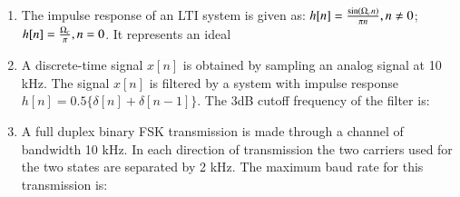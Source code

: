 \documentclass[journal,12pt,onecolumn]{IEEEtran}
\theoremstyle{remark}
\begin{document}
\begin{enumerate}
    \hfill{}
        \begin{enumerate}
        \end{enumerate}

    \item The impulse response of an LTI system is given as:
    $h[n] = \frac{\sin\left(\ohm_c n\right)}{\pi n}, n \neq 0$; $h[n] = \frac{\ohm_c}{\pi}, n=0$. It represents an ideal

    \hfill{}
        \begin{enumerate}
        \end{enumerate}

    \item A discrete-time signal $x[n]$ is obtained by sampling an analog signal at 10 kHz. The signal $x[n]$ is filtered by a system with impulse response $h[n] = 0.5\{\delta[n] + \delta[n-1]\}$. The 3dB cutoff frequency of the filter is:

    \hfill{}
        \begin{enumerate}
        \end{enumerate}

    \item A full duplex binary FSK transmission is made through a channel of bandwidth 10 kHz. In each direction of transmission the two carriers used for the two states are separated by 2 kHz. The maximum baud rate for this transmission is:


\end{enumerate}
\end{document}
